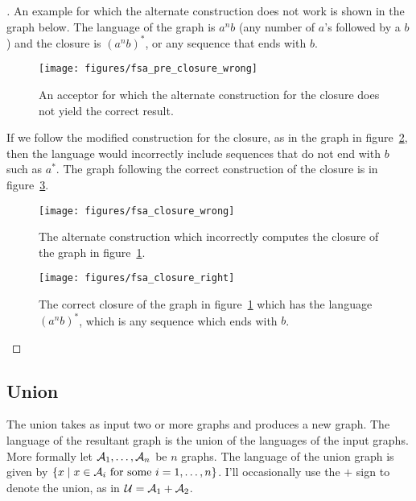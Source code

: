 \begin{proof}[\unskip\nopunct]
An example for which the alternate construction does not work is shown in the
graph below. The language of the graph is $a^nb$ (any number of $a$'s followed
by a $b$) and the closure is $(a^nb)^*$, or any sequence that ends with $b$.

\begin{figure}
    \centering
    \texttt{[image: figures/fsa\_pre\_closure\_wrong]}
    \caption{An acceptor for which the alternate construction for the closure
    does not yield the correct result.}
    \label{fig:fsa_pre_closure_wrong}
\end{figure}

If we follow the modified construction for the closure, as in the graph in
figure~\ref{fig:fsa_closure_wrong}, then the language would incorrectly
include sequences that do not end with $b$ such as $a^*$. The graph
following the correct construction of the closure is in
figure~\ref{fig:fsa_closure_right}.

\begin{figure}
    \centering
    \texttt{[image: figures/fsa\_closure\_wrong]}
    \caption{The alternate construction which incorrectly computes the closure
    of the graph in figure~\ref{fig:fsa_pre_closure_wrong}.}
    \label{fig:fsa_closure_wrong}
\end{figure}


\begin{figure}
    \centering
    \texttt{[image: figures/fsa\_closure\_right]}
    \caption{The correct closure of the graph in
    figure~\ref{fig:fsa_pre_closure_wrong} which has the language $(a^nb)^*$, which
    is any sequence which ends with $b$.}
    \label{fig:fsa_closure_right}
\end{figure}

\end{proof}

\subsection{Union}

The union takes as input two or more graphs and produces a new graph. The
language of the resultant graph is the union of the languages of the input
graphs. More formally let $\mathcal{A}_1, \ldots, \mathcal{A}_n$ be $n$ graphs. The language of
the union graph is given by $\{ x \mid x \in \mathcal{A}_i \textrm{ for some } i = 1,
\ldots, n \}$. I'll occasionally use the $+$ sign to denote the union, as in
$\mathcal{U} = \mathcal{A}_1 + \mathcal{A}_2$.

